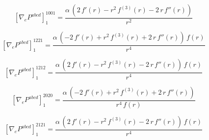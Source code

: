 \documentclass[11pt]{article}
\begin{document}
\par\smallskip
\begin{dmath*}[breakdepth={5}]
\left[\nabla_e P^{abcd}\right]_{1}^{1001} = \frac{\alpha\,\left(2\,f'\!\left(r\right) - {r}^{2}\,f^{(3)}\!\left(r\right) - 2\,r\,f''\!\left(r\right)\right)}{{r}^{2}}
\end{dmath*}
\par\smallskip
\begin{dmath*}[breakdepth={5}]
\left[\nabla_e P^{abcd}\right]_{1}^{1221} = \frac{\alpha\,\left(-2\,f'\!\left(r\right) + {r}^{2}\,f^{(3)}\!\left(r\right) + 2\,r\,f''\!\left(r\right)\right)\,f\!\left(r\right)}{{r}^{4}}
\end{dmath*}
\par\smallskip
\begin{dmath*}[breakdepth={5}]
\left[\nabla_e P^{abcd}\right]_{1}^{1212} = \frac{\alpha\,\left(2\,f'\!\left(r\right) - {r}^{2}\,f^{(3)}\!\left(r\right) - 2\,r\,f''\!\left(r\right)\right)\,f\!\left(r\right)}{{r}^{4}}
\end{dmath*}
\par\smallskip
\begin{dmath*}[breakdepth={5}]
\left[\nabla_e P^{abcd}\right]_{1}^{2020} = \frac{\alpha\,\left(-2\,f'\!\left(r\right) + {r}^{2}\,f^{(3)}\!\left(r\right) + 2\,r\,f''\!\left(r\right)\right)}{{r}^{4}\,f\!\left(r\right)}
\end{dmath*}
\par\smallskip
\begin{dmath*}[breakdepth={5}]
\left[\nabla_e P^{abcd}\right]_{1}^{2121} = \frac{\alpha\,\left(2\,f'\!\left(r\right) - {r}^{2}\,f^{(3)}\!\left(r\right) - 2\,r\,f''\!\left(r\right)\right)\,f\!\left(r\right)}{{r}^{4}}
\end{dmath*}
\par\smallskip
\end{document}
